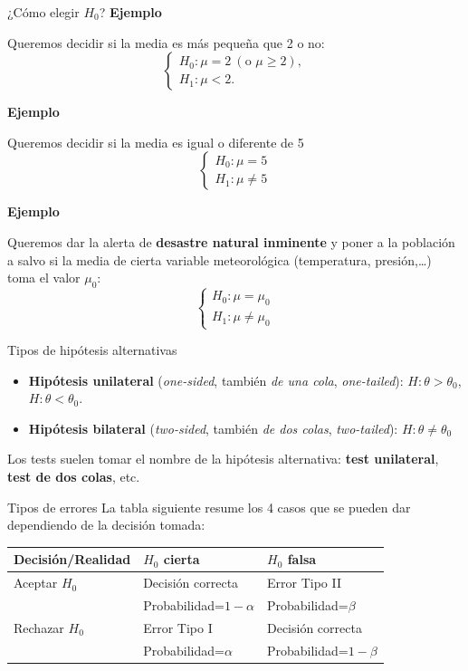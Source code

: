 \documentclass[
  ignorenonframetext,
]{beamer}
\begin{document}
\begin{frame}{¿Cómo elegir \(H_0\)?}
\protect\hypertarget{cuxf3mo-elegir-h_0}{}
\textbf{Ejemplo}

Queremos decidir si la media es más pequeña que 2 o no: \[
\left\{\begin{array}{ll} 
H_{0}:\mu= 2\ (\mbox{o } \mu \geq 2),\\ 
H_{1}:\mu< 2.
\end{array}
\right.
\]

\textbf{Ejemplo}

Queremos decidir si la media es igual o diferente de 5 \[
\left\{\begin{array}{ll} 
H_{0}:\mu= 5\\
H_{1}:\mu\neq 5
\end{array}
\right.
\]

\textbf{Ejemplo}

Queremos dar la alerta de \textbf{desastre natural inminente} y poner a
la población a salvo si la media de cierta variable meteorológica
(temperatura, presión,\ldots) toma el valor \(\mu_0\): \[
\left\{\begin{array}{ll} 
H_{0}:\mu= \mu_0\\
H_{1}:\mu\neq \mu_0
\end{array}
\right.
\]
\end{frame}

\begin{frame}{Tipos de hipótesis alternativas}
\protect\hypertarget{tipos-de-hipuxf3tesis-alternativas}{}
\begin{itemize}[<+->]
\item
  \textbf{Hipótesis unilateral} (\emph{one-sided}, también \emph{de una
  cola}, \emph{one-tailed}): \(H: \theta>\theta_{0}\),
  \(H: \theta<\theta_0\).
\item
  \textbf{Hipótesis bilateral} (\emph{two-sided}, también \emph{de dos
  colas}, \emph{two-tailed}): \(H: \theta\neq\theta_0\)
\end{itemize}

Los tests suelen tomar el nombre de la hipótesis alternativa:
\textbf{test unilateral}, \textbf{test de dos colas}, etc.
\end{frame}

\begin{frame}{Tipos de errores}
\protect\hypertarget{tipos-de-errores}{}
La tabla siguiente resume los 4 casos que se pueden dar dependiendo de
la decisión tomada:

\begin{longtable}[]{@{}lll@{}}
\toprule
Decisión/Realidad & \(H_{0}\) cierta & \(H_{0}\) falsa\tabularnewline
\midrule
\endhead
Aceptar \(H_{0}\) & Decisión correcta & Error Tipo II\tabularnewline
& Probabilidad=\(1-\alpha\) & Probabilidad=\(\beta\)\tabularnewline
Rechazar \(H_{0}\) & Error Tipo I & Decisión correcta\tabularnewline
& Probabilidad=\(\alpha\) & Probabilidad=\(1-\beta\)\tabularnewline
\bottomrule
\end{longtable}
\end{frame}
\end{document}
